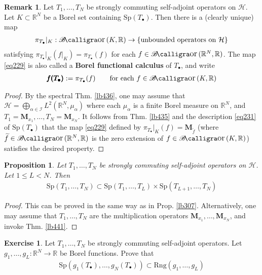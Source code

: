 \documentclass[12pt,b5paper,notitlepage]{article}
\theoremstyle{definition}
\newtheorem{exe}[df]{Exercise}
\newtheorem{rem}[df]{Remark}
\theoremstyle{plain}
\newtheorem{pp}[df]{Proposition}
\DeclareMathOperator{\Bor}{\mathscr{B}\text{\kern -2pt {\calligra\large or}}\,}
\newcommand{\wtd}{\widetilde}
\newcommand{\blt}{\bullet}
\newcommand{\Rbb}{\mathbb R}
\newcommand{\Sp}{\mathrm{Sp}}
\newcommand{\Rng}{\mathrm{Rng}}
\newcommand{\MH}{\mathcal H}
\newcommand{\SI}{\mathscr I}
\newcommand{\Mbf}{\mathbf M}
\numberwithin{equation}{section}
\begin{document}
\begin{rem}
Let $T_1,\dots,T_N$ be strongly commuting self-adjoint operators on $\MH$. Let $K\subset\Rbb^N$ be a Borel set containing $\Sp(T_\blt)$. Then there is a (clearly unique) map
\begin{align}\label{eq229}
\pi_{T_\blt}|_K:\Bor(K,\Rbb)\rightarrow\{\text{unbounded operators on }\MH\}
\end{align}
satisfying $\pi_{T_\blt}|_K(f|_K)=\pi_{T_\blt}(f)$ for each $f\in\Bor(\Rbb^N,\Rbb)$. The map \eqref{eq229} is also called a \textbf{Borel functional calculus}  of $T_\blt$, and write 
\begin{align*}
\pmb{f(T_\blt)}:=\pi_{T_\blt}(f)\qquad\text{for each }f\in\Bor(K,\Rbb)
\end{align*}
\end{rem}

\begin{proof}
By the spectral Thm. \ref{lb436}, one may assume that $\MH=\bigoplus_{\alpha\in\SI}L^2(\Rbb^N,\mu_\alpha)$ where each $\mu_\alpha$ is a finite Borel measure on $\Rbb^N$, and $T_1=\Mbf_{x_1},\dots,T_N=\Mbf_{x_N}$. It follows from Thm. \ref{lb435} and the description \eqref{eq231} of $\Sp(T_\blt)$ that the map \eqref{eq229} defined by $\pi_{T_\blt}|_K(f)=\Mbf_{\wtd f}$ (where $\wtd f\in\Bor(\Rbb^N,\Rbb)$ is the zero extension of $f\in\Bor(K,\Rbb)$) satisfies the desired property.
\end{proof}



\begin{pp}
Let $T_1,\dots,T_N$ be strongly commuting self-adjoint operators on $\MH$. Let $1\leq L<N$. Then
\begin{align}
\Sp(T_1,\dots,T_N)\subset\Sp(T_1,\dots,T_L)\times\Sp(T_{L+1},\dots,T_N)
\end{align}
\end{pp}

\begin{proof}
This can be proved in the same way as in Prop. \ref{lb307}. Alternatively, one may assume that $T_1,\dots,T_N$ are the multiplication operators $\Mbf_{x_1},\dots,\Mbf_{x_N}$, and invoke Thm. \ref{lb441}.
\end{proof}

\begin{exe}\label{lb474}
Let $T_1,\dots,T_N$ be strongly commuting self-adjoint operators. Let $g_1,\dots,g_L:\Rbb^N\rightarrow\Rbb$ be Borel functions. Prove that
\begin{align*}
\Sp(g_1(T_\blt),\dots,g_N(T_\blt))\subset\Rng(g_1,\dots,g_L)
\end{align*}
\end{exe}
\end{document}
